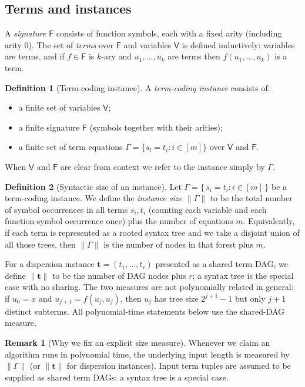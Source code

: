 \documentclass[11pt]{article}
\newcommand{\instsize}[1]{\lVert #1\rVert}
\theoremstyle{definition}
\newtheorem{definition}{Definition}[section]
\newtheorem{remark}{Remark}[section]
\theoremstyle{plain}
\newcommand{\Vars}{\mathsf{V}}
\newcommand{\Fun}{\mathsf{F}}
\begin{document}
\subsection{Terms and instances}
A \emph{signature} $\Fun$ consists of function symbols, each with a fixed arity (including arity $0$).
The set of \emph{terms} over $\Fun$ and variables $\Vars$ is defined inductively:
variables are terms, and if $f\in\Fun$ is $k$-ary and $u_1,\dots,u_k$ are terms then
$f(u_1,\dots,u_k)$ is a term.

\begin{definition}[Term-coding instance]
A \emph{term-coding instance} consists of:
\begin{itemize}[leftmargin=*]
\item a finite set of variables $\Vars$;
\item a finite signature $\Fun$ (symbols together with their arities);
\item a finite set of term equations $\Gamma=\{s_i=t_i: i\in[m]\}$ over $\Vars$ and $\Fun$.
\end{itemize}
When $\Vars$ and $\Fun$ are clear from context we refer to the instance simply by $\Gamma$.
\end{definition}

\begin{definition}[Syntactic size of an instance]
\label{def:instance-size}
Let $\Gamma=\{\,s_i=t_i : i\in[m]\,\}$ be a term-coding instance.
We define the \emph{instance size} $\instsize{\Gamma}$ to be the total number of symbol occurrences in
all terms $s_i,t_i$ (counting each variable and each function-symbol occurrence once) plus the number of
equations $m$.
Equivalently, if each term is represented as a rooted syntax tree and we take a disjoint union of all
those trees, then $\instsize{\Gamma}$ is the number of nodes in that forest plus $m$.

For a dispersion instance $\mathbf t=(t_1,\dots,t_r)$ presented as a shared term DAG, we define
$\instsize{\mathbf t}$ to be the number of DAG nodes plus $r$; a syntax tree is the special case with no
sharing.  The two measures are not polynomially related in general: if $u_0=x$ and
$u_{j+1}=f(u_j,u_j)$, then $u_j$ has tree size $2^{j+1}-1$ but only $j+1$ distinct subterms.
All polynomial-time statements below use the shared-DAG measure.
\end{definition}

\begin{remark}[Why we fix an explicit size measure]
Whenever we claim an algorithm runs in polynomial time, the underlying input length is measured by
$\instsize{\Gamma}$ (or $\instsize{\mathbf t}$ for dispersion instances).
Input term tuples are assumed to be supplied as shared term DAGs; a syntax tree is a special case.
\end{remark}
\end{document}
